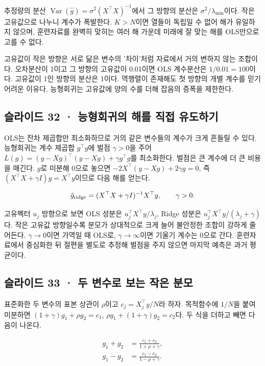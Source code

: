 \documentclass[11pt,a4paper]{article}
\begin{document}
추정량의 분산 $\operatorname{Var}(\hat g)=\sigma^2(X^\top X)^{-1}$에서 그 방향의 분산은 $\sigma^2/\lambda_{\min}$이다. 작은 고유값으로 나누니 계수가 폭발한다. $K>N$이면 열들이 독립일 수 없어 해가 유일하지 않으며, 훈련자료를 완벽히 맞히는 여러 해 가운데 미래에 잘 맞는 해를 OLS만으로 고를 수 없다.\par

고유값이 작은 방향은 서로 닮은 변수의 '차이'처럼 자료에서 거의 변하지 않는 조합이다. 오차분산이 1이고 그 방향의 고유값이 0.01이면 OLS 계수분산은 $1/0.01=100$이다. 고유값이 1인 방향의 분산은 1이다. 역행렬이 존재해도 첫 방향의 개별 계수를 믿기 어려운 이유다. 능형회귀는 고유값에 양의 수를 더해 잡음의 증폭을 제한한다.\par

\subsection{슬라이드 32 · 능형회귀의 해를 직접 유도하기}
OLS는 잔차 제곱합만 최소화하므로 거의 같은 변수들의 계수가 크게 흔들릴 수 있다. 능형회귀는 계수 제곱합 $g^\top g$에 벌점 $\gamma>0$을 주어 $L(g)=(y-Xg)^\top(y-Xg)+\gamma g^\top g$를 최소화한다. 벌점은 큰 계수에 더 큰 비용을 매긴다. $g$로 미분해 0으로 놓으면 $-2X^\top(y-Xg)+2\gamma g=0$, 즉 $(X^\top X+\gamma I)g=X^\top y$이므로 다음 해를 얻는다.\par

\[
\hat g_{\rm ridge}=(X^\top X+\gamma I)^{-1}X^\top y,\qquad\gamma>0.
\]

고유벡터 $u_j$ 방향으로 보면 OLS 성분은 $u_j^\top X^\top y/\lambda_j$, Ridge 성분은 $u_j^\top X^\top y/(\lambda_j+\gamma)$다. 작은 고유값 방향일수록 분모가 상대적으로 크게 늘어 불안정한 조합이 강하게 줄어든다. $\gamma\to0$이면 가역일 때 OLS로, $\gamma\to\infty$이면 기울기 계수는 0으로 간다. 훈련자료에서 중심화한 뒤 절편을 별도로 추정해 벌점을 주지 않으면 마지막 예측은 과거 평균이다.\par

\subsection{슬라이드 33 · 두 변수로 보는 작은 분모}
표준화한 두 변수의 표본 상관이 $\rho$이고 $c_j=X_j^\top y/N$라 하자. 목적함수에 $1/N$을 붙여 미분하면 $(1+\gamma)g_1+\rho g_2=c_1$, $\rho g_1+(1+\gamma)g_2=c_2$다. 두 식을 더하고 빼면 다음이 나온다.\par

\[
\begin{aligned}
g_1+g_2&=\frac{c_1+c_2}{1+\rho+\gamma},\\
g_1-g_2&=\frac{c_1-c_2}{1-\rho+\gamma}.
\end{aligned}
\]
\end{document}

